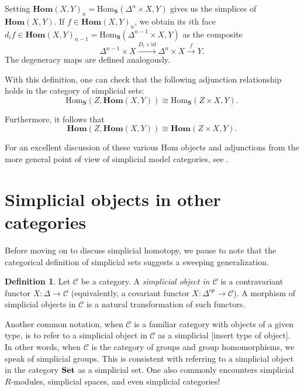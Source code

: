 \documentclass[12pt]{article}
\theoremstyle{plain}
\theoremstyle{definition}
\newtheorem{definition}[theorem]{Definition}
\theoremstyle{remark}
\newcommand{\mbf}[1]{\mathbf{#1}}
\newcommand{\Hom}{\text{Hom}}
\newcommand{\Homs}{\textbf{Hom}}
\newcommand{\Set}{\text{\textbf{Set}}}
\newcommand{\Cat}{\mathcal{C}}
\begin{document}
Setting $\Homs(X,Y)_n= \Hom_{\mbf S}(\Delta^n\times X,Y)$ gives us the simplices of $\Homs(X,Y)$. If $f\in \Homs(X,Y)_n$, we obtain its $i$th face $d_if\in \Homs(X,Y)_{n-1}= \Hom_{\mbf S}(\Delta^{n-1}\times X,Y)$ as the composite $$\Delta^{n-1}\times X\xrightarrow{D_i\times \text{id}}\Delta^{n}\times X\xrightarrow{f}Y.$$ The degeneracy maps are defined analogously. 

With this definition, one can check that the following adjunction relationship holds in the category of simplicial sets:
$$\Hom_{\mbf S}(Z,\Homs(X,Y))\cong \Hom_{\mbf S}(Z\times X,Y).$$

Furthermore, it follows that $$\Homs(Z,\Homs(X,Y))\cong \Homs(Z\times X,Y).$$

For an excellent discussion of these various $\Hom$ objects and adjunctions from the more general point of view of simplicial model categories, see \cite[Section II.2]{GoeJar}.



\section{Simplicial objects in other categories}\label{S: simplicial cats}


Before moving on to discuss simplicial homotopy, we pause to note that the categorical definition of simplicial sets suggests a sweeping generalization.

\begin{definition}
Let $\Cat$ be a category. A \emph{simplicial object in $\Cat$} 
is a contravariant functor $X\colon \Delta\to \Cat$ (equivalently, a covariant functor $X\colon  \Delta^{op}\to \Cat$). A morphism of simplicial objects in $\Cat$ is a natural transformation of such functors.
\end{definition}


Another common notation, when $\Cat$ is a familiar category with objects of a given type, is to refer to a simplicial object in $\Cat$ as a simplicial [insert type of object]. In other words, when $\Cat$ is the category of groups and group homomorphisms, we speak of simplicial groups. This is consistent with referring to a simplicial object in the category $\Set$ as a simplicial set. One also commonly encounters simplicial $R$-modules, simplicial spaces, and even simplicial categories!
\end{document}
